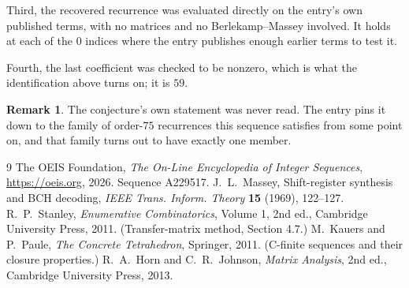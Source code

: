 \documentclass[11pt,a4paper]{article}
\theoremstyle{plain}
\theoremstyle{definition}
\newtheorem{remark}[theorem]{Remark}
\begin{document}
Third, the recovered recurrence was evaluated directly on the entry's own published terms, with
no matrices and no Berlekamp--Massey involved. It holds at each of the $0$ indices where
the entry publishes enough earlier terms to test it.

Fourth, the last coefficient was checked to be nonzero, which is what the identification above
turns on; it is $59$.

\begin{remark}
The conjecture's own statement was never read. The entry pins it down to the family of
order-$75$ recurrences this sequence satisfies from some point on, and that family turns
out to have exactly one member.
\end{remark}

\begin{thebibliography}{9}
 The OEIS Foundation, \emph{The On-Line Encyclopedia of Integer
Sequences}, \url{https://oeis.org}, 2026. Sequence A229517.
 J.~L.~Massey, Shift-register synthesis and BCH decoding, \emph{IEEE
Trans. Inform. Theory} \textbf{15} (1969), 122--127.
 R.~P.~Stanley, \emph{Enumerative Combinatorics}, Volume 1, 2nd ed.,
Cambridge University Press, 2011. (Transfer-matrix method, Section 4.7.)
 M.~Kauers and P.~Paule, \emph{The Concrete Tetrahedron}, Springer, 2011.
(C-finite sequences and their closure properties.)
 R.~A.~Horn and C.~R.~Johnson, \emph{Matrix Analysis}, 2nd ed., Cambridge
University Press, 2013.
\end{thebibliography}
\end{document}
